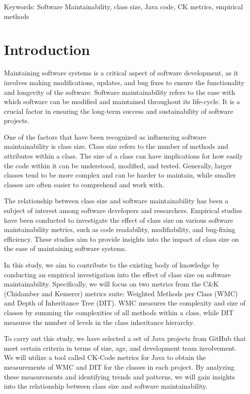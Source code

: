 \documentclass[conference]{IEEEtran}
\begin{document}
	\begin{IEEEkeywords}
		Keywords: Software Maintainability, class size, Java code, CK metrics, empirical methods
	\end{IEEEkeywords}
	
	\section{Introduction}
	Maintaining software systems is a critical aspect of software development, as it involves making modifications, updates, and bug fixes to ensure the functionality and longevity of the software. Software maintainability refers to the ease with which software can be modified and maintained throughout its life-cycle. It is a crucial factor in ensuring the long-term success and sustainability of software projects.
	
	One of the factors that have been recognized as influencing software maintainability is class size. Class size refers to the number of methods and attributes within a class. The size of a class can have implications for how easily the code within it can be understood, modified, and tested. Generally, larger classes tend to be more complex and can be harder to maintain, while smaller classes are often easier to comprehend and work with.
	
	The relationship between class size and software maintainability has been a subject of interest among software developers and researchers. Empirical studies have been conducted to investigate the effect of class size on various software maintainability metrics, such as code readability, modifiability, and bug-fixing efficiency. These studies aim to provide insights into the impact of class size on the ease of maintaining software systems.
	
	In this study, we aim to contribute to the existing body of knowledge by conducting an empirical investigation into the effect of class size on software maintainability. Specifically, we will focus on two metrics from the C\&K (Chidamber and Kemerer) metrics suite: Weighted Methods per Class (WMC) and Depth of Inheritance Tree (DIT). WMC measures the complexity and size of classes by summing the complexities of all methods within a class, while DIT measures the number of levels in the class inheritance hierarchy.
	
	To carry out this study, we have selected a set of Java projects from GitHub that meet certain criteria in terms of size, age, and development team involvement. We will utilize a tool called CK-Code metrics for Java to obtain the measurements of WMC and DIT for the classes in each project. By analyzing these measurements and identifying trends and patterns, we will gain insights into the relationship between class size and software maintainability.
	
\end{document}
